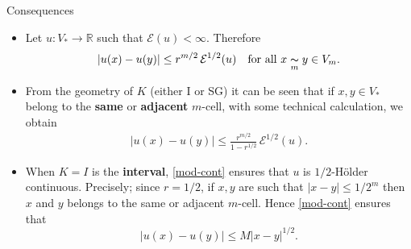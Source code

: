 \begin{frame}{Consequences}
\begin{itemize}
\item Let $u:V_*\rightarrow \mathbb{R}$ such that $\mathcal{E}(u)<\infty$. Therefore
\begin{align}
\lvert u(x)-u(y)\rvert\leq r^{m/2}\,\mathcal{E}^{1/2}(u)\quad \text{for all } x\underset{m}{\thicksim} y\in V_m.
\end{align}

\vspace{0.25cm}
\item From the geometry of $K$ (either I or SG) it can be seen that if $x,y\in V_*$ belong to the \textbf{same} or \textbf{adjacent} $m$-cell, with some technical calculation, we obtain 
\begin{align}\label{mod-cont}
\lvert u(x)-u(y)\rvert  \leq \frac{r^{m/2}}{1-r^{1/2}}\, \mathcal{E}^{1/2}(u).
\end{align}

\item When $K=I$ is the \textbf{interval}, \eqref{mod-cont} ensures that $u$ is $1/2$-Hölder continuous. Precisely; since $r=1/2$, if $x,y$ are such that $|x-y|\leq 1/2^{m}$ then $x$ and $y$ belongs to the same or adjacent $m$-cell. Hence \eqref{mod-cont} ensures that
\begin{equation}
    |u(x)-u(y)|\leq M |x-y|^{1/2}.
\end{equation}
\end{itemize} 
\end{frame}

